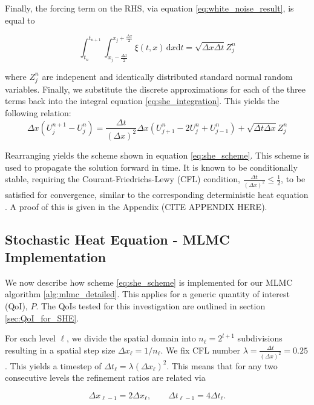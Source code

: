 Finally, the forcing term on the RHS, via equation \eqref{eq:white_noise_result}, is equal to

\begin{equation*}
\int_{t_n}^{t_{n+1}} \int_{x_j-\frac{\Delta x}{2}}^{x_j+\frac{\Delta x}{2}} \xi(t,x) \,\mathrm{d}x\mathrm{d}t = \sqrt{\Delta x \Delta t} Z_j^n
\end{equation*}

where $Z_j^n$ are indepenent and identically distributed standard normal random variables.
Finally, we substitute the discrete approximations for each of the three terms back into the 
integral equation \eqref{eq:she_integration}. This yields the following relation:
\begin{equation*}
    \Delta x (U_j^{n+1} - U_j^n) = 
    \frac{\Delta t}{(\Delta x)^2} \Delta x (U_{j+1}^n - 2U_j^n + U_{j-1}^n) + 
    \sqrt{\Delta t \Delta x} Z_j^n
\end{equation*}

Rearranging yields the scheme shown in equation \eqref{eq:she_scheme}.
This scheme is used to propagate the solution forward in time. It is known to 
be conditionally stable, requiring the Courant-Friedrichs-Lewy (CFL) condition, 
$\frac{\Delta t}{(\Delta x)^2} \le \frac{1}{2}$, to be satisfied for convergence, 
similar to the corresponding deterministic heat equation \cite{suli2025nspdes}. 
A proof of this is given in the Appendix (CITE APPENDIX HERE).

\subsection{Stochastic Heat Equation - MLMC Implementation}

We now describe how scheme \eqref{eq:she_scheme} is implemented for our MLMC
algorithm \ref{alg:mlmc_detailed}. This applies for a generic quantity of interest
(QoI), $P$. The QoIs tested for this investigation are outlined in section 
\ref{sec:QoI_for_SHE}.

For each level $\ell$, we divide the spatial domain into $n_{\ell} = 2^{l+1}$ subdivisions
resulting in a spatial step size $\Delta x_\ell = 1 / n_\ell$. We fix CFL number $\lambda = 
\frac{\Delta t}{(\Delta x)^2} = 0.25$. This yields a timestep of 
$\Delta t_\ell = \lambda (\Delta x_\ell)^2$. This means that for any two 
consecutive levels the refinement ratios are related via

\begin{equation}\label{eq:she_discrete_relations}
    \Delta x_{\ell - 1} = 2\Delta x_\ell, \qquad \Delta t_{\ell - 1} = 4 \Delta t_\ell.
\end{equation}

